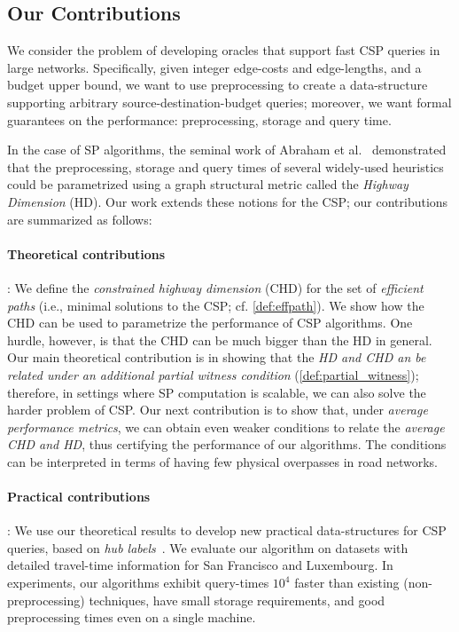 \subsection{Our Contributions}
We consider the problem of developing oracles that support fast CSP queries in large networks. 
Specifically, given integer edge-costs and edge-lengths, and a budget upper bound, we want to use preprocessing to create a data-structure supporting arbitrary source-destination-budget queries; moreover, we want formal guarantees on the performance: preprocessing, storage and query time.

In the case of SP algorithms, the seminal work of Abraham et al.~\citep{highway2013, highway2010} demonstrated that the preprocessing, storage and query times of several widely-used heuristics could be parametrized using a graph structural metric called the \emph{Highway Dimension} (HD).
Our work extends these notions for the CSP; our contributions are summarized as follows:

\paragraph{Theoretical contributions}: 
We define the \emph{constrained highway dimension} (CHD) for the set of {\em efficient paths} (i.e., minimal solutions to the CSP; cf. \cref{def:effpath}). 
We show how the CHD can be used to parametrize the performance of CSP algorithms.
One hurdle, however, is that the CHD can be much bigger than the HD in general.
Our main theoretical contribution is in showing that the \emph{HD and CHD an be related under an additional partial witness condition} (\cref{def:partial_witness}); therefore, in settings where SP computation is scalable, we can also solve the harder problem of CSP. 
Our next contribution is to show that, under \emph{average performance metrics}, we can obtain even weaker conditions to relate the \emph{average CHD and HD}, thus certifying the performance of our algorithms.
The conditions can be interpreted in terms of having few physical overpasses in road networks.

\paragraph{Practical contributions}: 
We use our theoretical results to develop new practical data-structures for CSP queries, based on {\em hub labels}~\citep{cohen_definition_hl}. 
We evaluate our algorithm on datasets with detailed travel-time information for San Francisco and Luxembourg.
In experiments, our algorithms exhibit query-times $10^4$ faster than existing (non-preprocessing) techniques, have small storage requirements, and good preprocessing times even on a single machine. 
 

